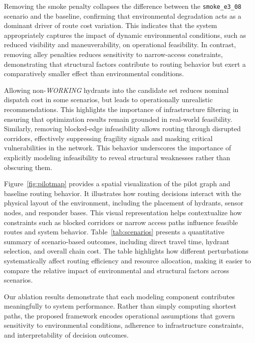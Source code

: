 Removing the smoke penalty collapses the difference between the \texttt{smoke\_e3\_08} scenario and the baseline, confirming that environmental degradation acts as a dominant driver of route cost variation. This indicates that the system appropriately captures the impact of dynamic environmental conditions, such as reduced visibility and maneuverability, on operational feasibility. In contrast, removing alley penalties reduces sensitivity to narrow-access constraints, demonstrating that structural factors contribute to routing behavior but exert a comparatively smaller effect than environmental conditions.

Allowing non-\textit{WORKING} hydrants into the candidate set reduces nominal dispatch cost in some scenarios, but leads to operationally unrealistic recommendations. This highlights the importance of infrastructure filtering in ensuring that optimization results remain grounded in real-world feasibility. Similarly, removing blocked-edge infeasibility allows routing through disrupted corridors, effectively suppressing fragility signals and masking critical vulnerabilities in the network. This behavior underscores the importance of explicitly modeling infeasibility to reveal structural weaknesses rather than obscuring them.

Figure~\ref{fig:pilotmap} provides a spatial visualization of the pilot graph and baseline routing behavior. It illustrates how routing decisions interact with the physical layout of the environment, including the placement of hydrants, sensor nodes, and responder bases. This visual representation helps contextualize how constraints such as blocked corridors or narrow access paths influence feasible routes and system behavior. Table~\ref{tab:scenarios} presents a quantitative summary of scenario-based outcomes, including direct travel time, hydrant selection, and overall chain cost. The table highlights how different perturbations systematically affect routing efficiency and resource allocation, making it easier to compare the relative impact of environmental and structural factors across scenarios.

Our ablation results demonstrate that each modeling component contributes meaningfully to system performance. Rather than simply computing shortest paths, the proposed framework encodes operational assumptions that govern sensitivity to environmental conditions, adherence to infrastructure constraints, and interpretability of decision outcomes.


\
